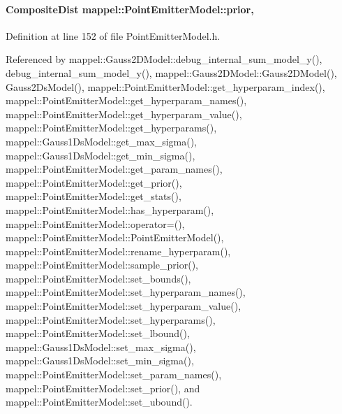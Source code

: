 \paragraph[{\texorpdfstring{prior}{prior}}]{\setlength{\rightskip}{0pt plus 5cm}Composite\+Dist mappel\+::\+Point\+Emitter\+Model\+::prior\hspace{0.3cm}{\ttfamily [protected]}, {\ttfamily [inherited]}}\hypertarget{classmappel_1_1PointEmitterModel_a393839f8eb1dd3d61c9369377742ba0e}{}\label{classmappel_1_1PointEmitterModel_a393839f8eb1dd3d61c9369377742ba0e}


Definition at line 152 of file Point\+Emitter\+Model.\+h.



Referenced by mappel\+::\+Gauss2\+D\+Model\+::debug\+\_\+internal\+\_\+sum\+\_\+model\+\_\+y(), debug\+\_\+internal\+\_\+sum\+\_\+model\+\_\+y(), mappel\+::\+Gauss2\+D\+Model\+::\+Gauss2\+D\+Model(), Gauss2\+Ds\+Model(), mappel\+::\+Point\+Emitter\+Model\+::get\+\_\+hyperparam\+\_\+index(), mappel\+::\+Point\+Emitter\+Model\+::get\+\_\+hyperparam\+\_\+names(), mappel\+::\+Point\+Emitter\+Model\+::get\+\_\+hyperparam\+\_\+value(), mappel\+::\+Point\+Emitter\+Model\+::get\+\_\+hyperparams(), mappel\+::\+Gauss1\+Ds\+Model\+::get\+\_\+max\+\_\+sigma(), mappel\+::\+Gauss1\+Ds\+Model\+::get\+\_\+min\+\_\+sigma(), mappel\+::\+Point\+Emitter\+Model\+::get\+\_\+param\+\_\+names(), mappel\+::\+Point\+Emitter\+Model\+::get\+\_\+prior(), mappel\+::\+Point\+Emitter\+Model\+::get\+\_\+stats(), mappel\+::\+Point\+Emitter\+Model\+::has\+\_\+hyperparam(), mappel\+::\+Point\+Emitter\+Model\+::operator=(), mappel\+::\+Point\+Emitter\+Model\+::\+Point\+Emitter\+Model(), mappel\+::\+Point\+Emitter\+Model\+::rename\+\_\+hyperparam(), mappel\+::\+Point\+Emitter\+Model\+::sample\+\_\+prior(), mappel\+::\+Point\+Emitter\+Model\+::set\+\_\+bounds(), mappel\+::\+Point\+Emitter\+Model\+::set\+\_\+hyperparam\+\_\+names(), mappel\+::\+Point\+Emitter\+Model\+::set\+\_\+hyperparam\+\_\+value(), mappel\+::\+Point\+Emitter\+Model\+::set\+\_\+hyperparams(), mappel\+::\+Point\+Emitter\+Model\+::set\+\_\+lbound(), mappel\+::\+Gauss1\+Ds\+Model\+::set\+\_\+max\+\_\+sigma(), mappel\+::\+Gauss1\+Ds\+Model\+::set\+\_\+min\+\_\+sigma(), mappel\+::\+Point\+Emitter\+Model\+::set\+\_\+param\+\_\+names(), mappel\+::\+Point\+Emitter\+Model\+::set\+\_\+prior(), and mappel\+::\+Point\+Emitter\+Model\+::set\+\_\+ubound().

